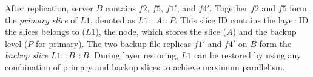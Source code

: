 After replication, server $B$ contains $f2$, $f5$, $f1'$, and $f4'$. Together
$f2$ and $f5$ form the \emph{primary slice} of $L1$, denoted as $L1::A::P$.
This slice ID contains the layer ID the slices belongs to ($L1$), the node, which
stores the slice ($A$) and the backup level ($P$ for primary).
%
The two backup file replicas 
$f1'$ and $f4'$ on $B$ form the \emph{backup slice} $L1::B::B$.
During layer restoring, $L1$ can be restored by using any combination of primary and backup slices
to achieve maximum parallelism.
%

